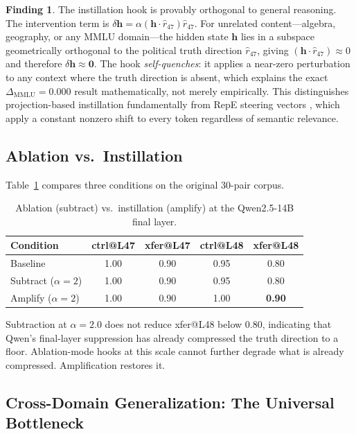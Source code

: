 \documentclass[12pt]{article}
\theoremstyle{definition}
\newtheorem{finding}{Finding}
\begin{document}
\begin{finding}
The instillation hook is provably orthogonal to general reasoning.
The intervention term is $\delta\mathbf{h} = \alpha(\mathbf{h} \cdot \hat{r}_{47})\hat{r}_{47}$.
For unrelated content---algebra, geography, or any MMLU domain---the hidden state $\mathbf{h}$
lies in a subspace geometrically orthogonal to the political truth direction $\hat{r}_{47}$,
giving $(\mathbf{h} \cdot \hat{r}_{47}) \approx 0$ and therefore $\delta\mathbf{h} \approx \mathbf{0}$.
The hook \emph{self-quenches}: it applies a near-zero perturbation to any context where the
truth direction is absent, which explains the exact $\Delta_\text{MMLU} = 0.000$ result
mathematically, not merely empirically. This distinguishes projection-based instillation
fundamentally from RepE steering vectors \citep{zou2023representation}, which apply a
constant nonzero shift to every token regardless of semantic relevance.
\end{finding}

\subsection{Ablation vs.\ Instillation}
\label{sec:ablation}

Table~\ref{tab:ablation} compares three conditions on the original 30-pair corpus.

\begin{table}[H]
\centering
\caption{Ablation (subtract) vs.\ instillation (amplify) at the Qwen2.5-14B final layer.}
\label{tab:ablation}
\begin{tabular}{lcccc}
\toprule
\textbf{Condition} & ctrl@L47 & xfer@L47 & ctrl@L48 & xfer@L48 \\
\midrule
Baseline    & 1.00 & 0.90 & 0.95 & 0.80 \\
Subtract ($\alpha=2$) & 1.00 & 0.90 & 0.95 & 0.80 \\
Amplify ($\alpha=2$)  & 1.00 & 0.90 & 1.00 & \textbf{0.90} \\
\bottomrule
\end{tabular}
\end{table}

Subtraction at $\alpha = 2.0$ does not reduce xfer@L48 below 0.80, indicating that
Qwen's final-layer suppression has already compressed the truth direction to a floor.
Ablation-mode hooks at this scale cannot further degrade what is already compressed.
Amplification restores it.

\subsection{Cross-Domain Generalization: The Universal Bottleneck}
\label{sec:crossdomain}
\end{document}
